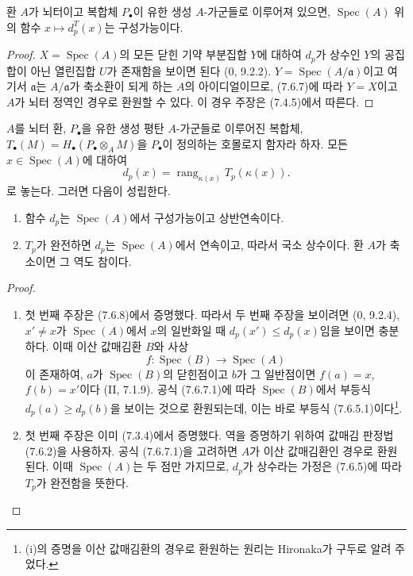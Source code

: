 \begin{lemma}[7.6.8]
\label{III.7.6.8-fr}
환 $A$가 뇌터이고 복합체 $P_\bullet$이 유한 생성 $A$-가군들로
이루어져 있으면, $\operatorname{Spec}(A)$ 위의 함수
$x\mapsto d_p^T(x)$는 구성가능이다.
\end{lemma}

\begin{proof}
$X=\operatorname{Spec}(A)$의 모든 닫힌 기약 부분집합 $Y$에 대하여
$d_p$가 상수인 $Y$의 공집합이 아닌 열린집합 $U$가 존재함을 보이면
된다 ($0$, 9.2.2). $Y=\operatorname{Spec}(A/\mathfrak a)$이고 여기서
$\mathfrak a$는 $A/\mathfrak a$가 축소환이 되게 하는 $A$의
아이디얼이므로, (7.6.7)에 따라 $Y=X$이고 $A$가 뇌터 정역인 경우로
환원할 수 있다. 이 경우 주장은 (7.4.5)에서 따른다.
\end{proof}

\begin{theorem}[7.6.9]
\label{III.7.6.9-fr}
$A$를 뇌터 환, $P_\bullet$을 유한 생성 평탄 $A$-가군들로 이루어진
복합체, $T_\bullet(M)=H_\bullet(P_\bullet\otimes_A M)$을
$P_\bullet$이 정의하는 호몰로지 함자라 하자. 모든
$x\in\operatorname{Spec}(A)$에 대하여
\[
  d_p(x)=\operatorname{rang}_{\kappa(x)}T_p(\kappa(x)).
\]
로 놓는다. 그러면 다음이 성립한다.
\begin{enumerate}
  \item[(i)] 함수 $d_p$는 $\operatorname{Spec}(A)$에서 구성가능이고
    상반연속이다.
  \item[(ii)] $T_p$가 완전하면 $d_p$는 $\operatorname{Spec}(A)$에서
    연속이고, 따라서 국소 상수이다. 환 $A$가 축소이면 그 역도 참이다.
\end{enumerate}
\end{theorem}

\begin{proof}
\begin{enumerate}
  \item[(i)] 첫 번째 주장은 (7.6.8)에서 증명했다. 따라서 두 번째 주장을
    보이려면 ($0$, 9.2.4), $x'\ne x$가
    $\operatorname{Spec}(A)$에서 $x$의 일반화일 때
    $d_p(x')\leq d_p(x)$임을 보이면 충분하다. 이때 이산 값매김환 $B$와
    사상
    \[
      f:\operatorname{Spec}(B)\longrightarrow\operatorname{Spec}(A)
    \]
    이 존재하여, $a$가 $\operatorname{Spec}(B)$의 닫힌점이고 $b$가 그
    일반점이면 $f(a)=x$, $f(b)=x'$이다 (II, 7.1.9). 공식 (7.6.7.1)에
    따라 $\operatorname{Spec}(B)$에서 부등식 $d_p(a)\geq d_p(b)$을
    보이는 것으로 환원되는데, 이는 바로 부등식
    (7.6.5.1)이다\footnote{(i)의 증명을 이산 값매김환의 경우로 환원하는
    원리는 Hironaka가 구두로 알려 주었다.}.
  \item[(ii)] 첫 번째 주장은 이미 (7.3.4)에서 증명했다. 역을 증명하기
    위하여 값매김 판정법 (7.6.2)을 사용하자. 공식 (7.6.7.1)을 고려하면
    $A$가 이산 값매김환인 경우로 환원된다. 이때
    $\operatorname{Spec}(A)$는 두 점만 가지므로, $d_p$가 상수라는 가정은
    (7.6.5)에 따라 $T_p$가 완전함을 뜻한다.
\end{enumerate}
\end{proof}

